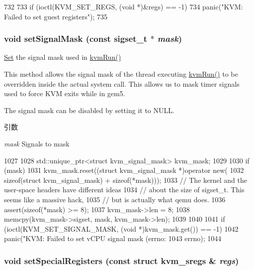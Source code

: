 \begin{DoxyCode}
732 {
733     if (ioctl(KVM_SET_REGS, (void *)&regs) == -1)
734         panic("KVM: Failed to set guest registers\n");
735 }
\end{DoxyCode}
\hypertarget{classBaseKvmCPU_a76bff52136628a5be57e6d1ea8ff5370}{
\subsubsection[{setSignalMask}]{\setlength{\rightskip}{0pt plus 5cm}void setSignalMask (const sigset\_\-t $\ast$ {\em mask})}}
\label{classBaseKvmCPU_a76bff52136628a5be57e6d1ea8ff5370}
\hyperlink{classSet}{Set} the signal mask used in \hyperlink{classBaseKvmCPU_aed3dbd0c0bf26d82ee56367a3f350506}{kvmRun()}

This method allows the signal mask of the thread executing \hyperlink{classBaseKvmCPU_aed3dbd0c0bf26d82ee56367a3f350506}{kvmRun()} to be overridden inside the actual system call. This allows us to mask timer signals used to force KVM exits while in gem5.

The signal mask can be disabled by setting it to NULL.


\begin{DoxyParams}{引数}
\item[{\em mask}]Signals to mask \end{DoxyParams}



\begin{DoxyCode}
1027 {
1028     std::unique_ptr<struct kvm_signal_mask> kvm_mask;
1029 
1030     if (mask) {
1031         kvm_mask.reset((struct kvm_signal_mask *)operator new(
1032                            sizeof(struct kvm_signal_mask) + sizeof(*mask)));
1033         // The kernel and the user-space headers have different ideas
1034         // about the size of sigset_t. This seems like a massive hack,
1035         // but is actually what qemu does.
1036         assert(sizeof(*mask) >= 8);
1037         kvm_mask->len = 8;
1038         memcpy(kvm_mask->sigset, mask, kvm_mask->len);
1039     }
1040 
1041     if (ioctl(KVM_SET_SIGNAL_MASK, (void *)kvm_mask.get()) == -1)
1042         panic("KVM: Failed to set vCPU signal mask (errno: %
1043               errno);
1044 }
\end{DoxyCode}
\hypertarget{classBaseKvmCPU_aefaac43fa62903f42a68a637083d5f09}{
\subsubsection[{setSpecialRegisters}]{\setlength{\rightskip}{0pt plus 5cm}void setSpecialRegisters (const struct kvm\_\-sregs \& {\em regs})}}
\label{classBaseKvmCPU_aefaac43fa62903f42a68a637083d5f09}



